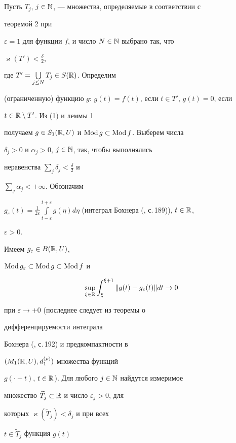 \begin{pf}


Пусть $T_j$, $j\in\Bbb N$, --- множества, определяемые в соответствии с


теоремой 2 при


$\varepsilon=1$ для функции $f$, и число $N\in\Bbb N$ выбрано так, что


$\varkappa(T')<\frac{\delta}{2}$,


где $T'=\bigcup\limits_{j\le N}T_j\in S(\Bbb R)$. Определим


(ограниченную) функцию $g$: $g(t)=f(t)$, если $t\in T'$, $g(t)=0$, если


$t\in\Bbb R\setminus T'$. Из (1) и леммы 1


получаем $g\in S_1(\Bbb R,U)$ и $\operatorname{Mod} g\subset\operatorname{Mod} f$. Выберем числа


$\delta_j>0$ и $\alpha_j>0$, $j\in\Bbb N$, так, чтобы выполнялись


неравенства $\sum\limits_j\delta_j<\frac{\delta}{2}$ и


$\sum\limits_j\alpha_j<+\infty$. Обозначим


$g_\varepsilon(t)=


\frac{1}{2\varepsilon}\int\limits^{t+\varepsilon}_{t-\varepsilon}


g(\eta)d\eta$ (интеграл Бохнера (\cite{15}, с.\,189)), $t\in\Bbb R$,


$\varepsilon>0$.


Имеем $g_\varepsilon\in B(\Bbb R,U)$,


$\operatorname{Mod} g_\varepsilon\subset\operatorname{Mod} g\subset \operatorname{Mod} f$ и


$$


\sup_{\xi\in\Bbb R}\int^{\xi+1}_\xi\|g(t)-g_\varepsilon(t)\|dt


\to 0


$$


при $\varepsilon\to+0$ (последнее следует из теоремы о


дифференцируемости интеграла


Бохнера (\cite{15}, с.\,192) и предкомпактности в


$(M_1(\Bbb R,U),d^{(\rho)}_1)$ множества функций


$g(\cdot+t)$, $t\in\Bbb R$). Для любого $j\in\Bbb N$ найдутся измеримое


множество $\widetilde T_j\subset\Bbb R$ и число $\varepsilon_j>0$, для


которых $\varkappa(\widetilde T_j)<\delta_j$ и при всех


$t\in\widetilde T_j$ функция $g(t)$



\end{pf}
